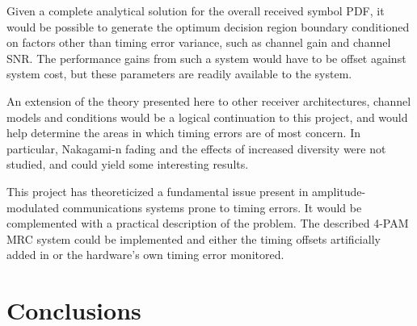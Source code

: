 Given a complete analytical solution for the overall received symbol PDF, it would be possible to generate the optimum decision region boundary conditioned on factors other than timing error variance, such as channel gain and channel SNR. The performance gains from such a system would have to be offset against system cost, but these parameters are readily available to the system.

An extension of the theory presented here to other receiver architectures, channel models and conditions would be a logical continuation to this project, and would help determine the areas in which timing errors are of most concern. In particular, Nakagami-n fading and the effects of increased diversity were not studied, and could yield some interesting results.

This project has theoreticized a fundamental issue present in amplitude-modulated communications systems prone to timing errors. It would be complemented with a practical description of the problem. The described 4-PAM MRC system could be implemented and either the timing offsets artificially added in or the hardware's own timing error monitored.

\chapter{Conclusions}




